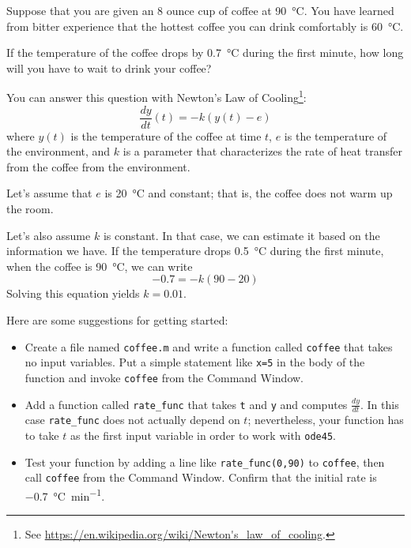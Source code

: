 \documentclass[
]{book}
\numberwithin{Answer}{chapter}
\numberwithin{Exercise}{chapter}
\begin{document}
\begin{ex}
Suppose that you are given an 8 ounce cup of coffee at \SI{90}{\celsius}.
You have learned from bitter experience that the hottest coffee you
can drink comfortably is \SI{60}{\celsius}.  

If the temperature of the coffee drops by \SI{0.7}{\celsius} during the first minute, how long will you have to wait to drink your coffee?

You can answer this question with Newton's Law of Cooling\footnote{See \url{https://en.wikipedia.org/wiki/Newton's_law_of_cooling}.}:
%
\begin{equation*}
\frac{dy}{dt}(t) = -k (y(t) - e)
\end{equation*}
%
where $y(t)$ is the temperature of the coffee at time $t$,
$e$ is the temperature of the environment, and $k$ is a parameter
that characterizes the rate of heat transfer from the coffee from the environment.

Let's assume that $e$ is \SI{20}{\celsius} and constant; that is, the coffee does not warm up the room.

Let's also assume $k$ is constant.  In that case, we can estimate it based on the information we have.  If the temperature drops \SI{0.5}{\celsius} during the first minute, when the coffee is \SI{90}{\celsius}, we can write
%
\begin{equation*}
-0.7 = -k (90 - 20)
\end{equation*}
%
Solving this equation yields $k = 0.01$.

Here are some suggestions for getting started:

\begin{itemize}

\item Create a file named {\tt coffee.m} and write a function
called {\tt coffee} that takes no input variables.  Put a simple statement like {\tt x=5} in the body of the function and invoke {\tt coffee} from the {\sf Command Window}.

\item Add a function called {\tt rate\_func} that takes {\tt t} and {\tt y} and computes $\frac{dy}{dt}$.  In this case {\tt rate\_func} does not actually depend on $t$; nevertheless, your function has to take $t$ as
the first input variable in order to work with {\tt ode45}.

\item Test your function by adding a line like {\tt rate\_func(0,90)}
to {\tt coffee}, then call {\tt coffee} from the {\sf Command Window}.
Confirm that the initial rate is \SI{-0.7}{\celsius \per \minute}.


\end{itemize}
\end{ex}
\end{document}

